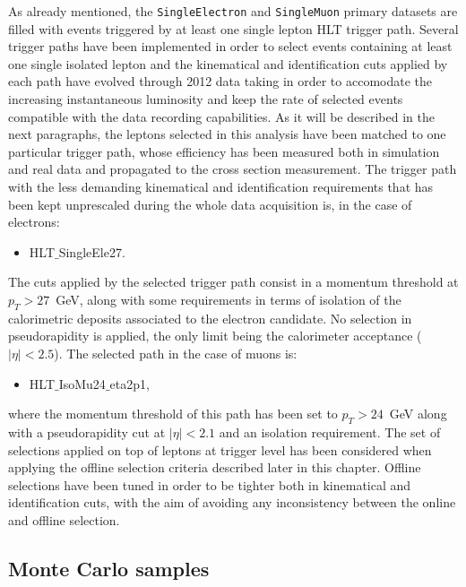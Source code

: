 As already mentioned, the \texttt{SingleElectron} and \texttt{SingleMuon} primary datasets
are filled with events triggered by at least one single lepton HLT trigger path.
Several trigger paths have been implemented in order to select events 
containing at least one single isolated lepton and the kinematical and 
identification cuts applied by each path have evolved through 2012 data taking 
in order to accomodate the increasing instantaneous luminosity and keep 
the rate of selected events compatible with the data recording capabilities.
As it will be described in the next paragraphs, 
the leptons selected in this analysis have been matched to 
one particular trigger path, whose efficiency has been measured both in 
simulation and real data and propagated to the cross section measurement. 
The trigger path with the less demanding kinematical and identification
requirements that has been kept unprescaled during the whole data acquisition 
is, in the case of electrons:
\begin{itemize}
  \item HLT$\_$SingleEle27.
\end{itemize}
The cuts applied by the selected trigger path consist in a momentum threshold 
at $p_{T} > 27$~GeV, along with some requirements in terms of isolation of the 
calorimetric deposits associated to the electron candidate. No selection in 
pseudorapidity is applied, the only limit being the calorimeter acceptance ($|\eta|<2.5$).
The selected path in the case of muons is:
\begin{itemize}
  \item HLT$\_$IsoMu24$\_$eta2p1,
\end{itemize}
where the momentum threshold of this path has been set to $p_{T} > 24$~GeV
along with a pseudorapidity cut at $|\eta| < 2.1$ and an isolation 
requirement.
The set of selections applied on top of leptons at trigger level 
has been considered when applying the offline selection criteria described later in 
this chapter. Offline selections have been tuned in order to be tighter both in kinematical 
and identification cuts, with the aim of avoiding any inconsistency between the online 
and offline selection. 


\subsection{Monte Carlo samples}
\label{sec:mcsamples}

